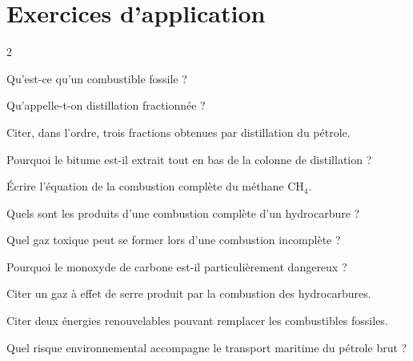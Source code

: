 \section{Exercices d'application}
\begin{multicols}{2}

\exo{} Qu'est-ce qu'un combustible fossile ?

\exo{} Qu'appelle-t-on distillation fractionnée ?

\exo{} Citer, dans l'ordre, trois fractions obtenues par distillation du pétrole.

\exo{} Pourquoi le bitume est-il extrait tout en bas de la colonne de
distillation ?

\exo{} Écrire l'équation de la combustion complète du méthane $\mathrm{CH_4}$.

\exo{} Quels sont les produits d'une combustion complète d'un hydrocarbure ?

\exo{} Quel gaz toxique peut se former lors d'une combustion incomplète ?

\exo{} Pourquoi le monoxyde de carbone est-il particulièrement dangereux ?

\exo{} Citer un gaz à effet de serre produit par la combustion des hydrocarbures.

\exo{} Citer deux énergies renouvelables pouvant remplacer les combustibles
fossiles.

\exo{} Quel risque environnemental accompagne le transport maritime du pétrole
brut ?

\end{multicols}

